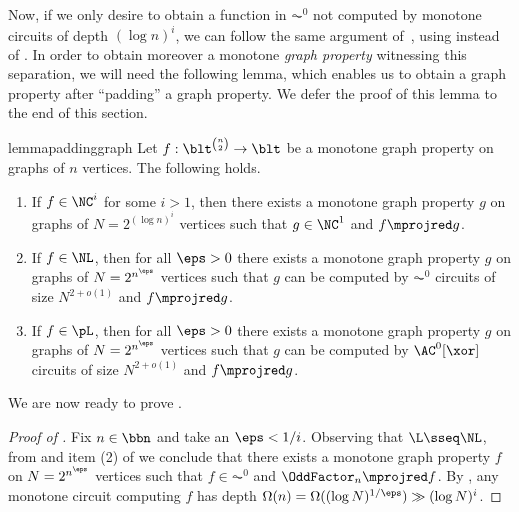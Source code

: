 \documentclass[11pt]{article}
\begin{document}
Now, if we only desire to obtain a function in $\AC^0$
not computed by monotone circuits of depth $(\log n)^i$,
we can follow the same argument of~,
using  instead of .
In order to obtain moreover a monotone \emph{graph property} witnessing
this separation, we will need the following lemma,
which enables us to obtain a graph property after ``padding'' a graph property.
We defer the proof of this lemma to
the end of this section.

\begin{restatable}{lemma}{paddinggraph}
    \label{lemma:padding_graph}
    Let $f : \blt^{\binom{n}{2}} \to \blt$
    be a monotone graph property on graphs of $n$ vertices.
    The following holds.
    \begin{enumerate}
        \item If $f \in \NC^i$ for some $i > 1$, then
            there exists a monotone graph property 
            $g$ on graphs of 
            $N = 2^{(\log n)^i}$ vertices
            such that 
            $g \in \NC^1$
            and 
            $f \mprojred g$.
        \item If $f \in \NL$, 
            then
            for all $\eps > 0$
            there exists
            a monotone graph property 
            $g$ on graphs of 
            $N = 2^{n^\eps}$ vertices
            such that 
            $g$ can be computed by  $\AC^0$ circuits of size $N^{2+o(1)}$
            and 
            $f \mprojred g$.
        \item If $f \in \pL$, 
            then
            for all $\eps > 0$
            there exists
            a monotone graph property 
            $g$ on graphs of 
            $N = 2^{n^\eps}$ vertices
            such that 
            $g$ can be computed by  $\AC^0[\xor]$ circuits of size $N^{2+o(1)}$
            and 
            $f \mprojred g$.
    \end{enumerate}
\end{restatable}

We are now ready to prove
.
\begin{proof}[Proof of ]
            Fix $n \in \bbn$ and take an $\eps < 1/i$.
            Observing that $\L \sseq \NL$,
            from
            and item (2) of 
            we conclude that
            there exists a monotone graph property $f$
            on 
            $N = 2^{n^\eps}$
            vertices
            such that 
            $f \in \AC^0$
            and $\OddFactor_n \mprojred f$.
            By ,
            any monotone circuit computing $f$
            has depth 
            $\Omega(n) = \Omega((\log N)^{1/\eps}) \gg (\log N)^i$.
\end{proof}
\end{document}
